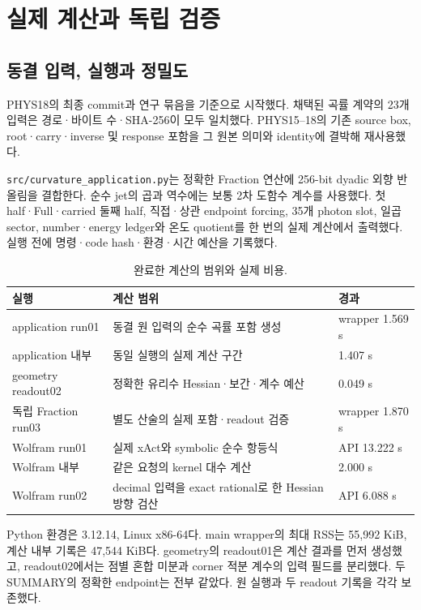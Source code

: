 \section{실제 계산과 독립 검증}
\subsection{동결 입력, 실행과 정밀도}
PHYS18의 최종 commit과 연구 묶음을 기준으로 시작했다.
채택된 곡률 계약의 23개 입력은 경로·바이트 수·SHA-256이 모두 일치했다.
PHYS15--18의 기존 source box, root·carry·inverse 및 response 포함을
그 원본 의미와 identity에 결박해 재사용했다.

\texttt{src/curvature\_application.py}는 정확한 Fraction 연산에
256-bit dyadic 외향 반올림을 결합한다.
순수 jet의 곱과 역수에는 보통 2차 도함수 계수를 사용했다.
첫 half·Full·carried 둘째 half,
직접·상관 endpoint forcing,
35개 photon slot, 일곱 sector, number·energy ledger와 온도 quotient를
한 번의 실제 계산에서 출력했다.
실행 전에 명령·code hash·환경·시간 예산을 기록했다.

\begin{table}[H]\centering\small
\caption{완료한 계산의 범위와 실제 비용.}
\begin{tabularx}{\textwidth}{lXl}
\toprule
실행 & 계산 범위 & 경과\\
\midrule
application run01 & 동결 원 입력의 순수 곡률 포함 생성 & wrapper 1.569 s\\
application 내부 & 동일 실행의 실제 계산 구간 & 1.407 s\\
geometry readout02 & 정확한 유리수 Hessian·보간·계수 예산 & 0.049 s\\
독립 Fraction run03 & 별도 산술의 실제 포함·readout 검증 & wrapper 1.870 s\\
Wolfram run01 & 실제 xAct와 symbolic 순수 항등식 & API 13.222 s\\
Wolfram 내부 & 같은 요청의 kernel 대수 계산 & 2.000 s\\
Wolfram run02 & decimal 입력을 exact rational로 한 Hessian 방향 검산 & API 6.088 s\\
\bottomrule
\end{tabularx}
\end{table}
Python 환경은 3.12.14, Linux x86-64다.
main wrapper의 최대 RSS는 55,992 KiB, 계산 내부 기록은 47,544 KiB다.
geometry의 readout01은 계산 결과를 먼저 생성했고,
readout02에서는 점별 혼합 미분과 corner 적분 계수의 입력 필드를 분리했다.
두 SUMMARY의 정확한 endpoint는 전부 같았다.
원 실행과 두 readout 기록을 각각 보존했다.

